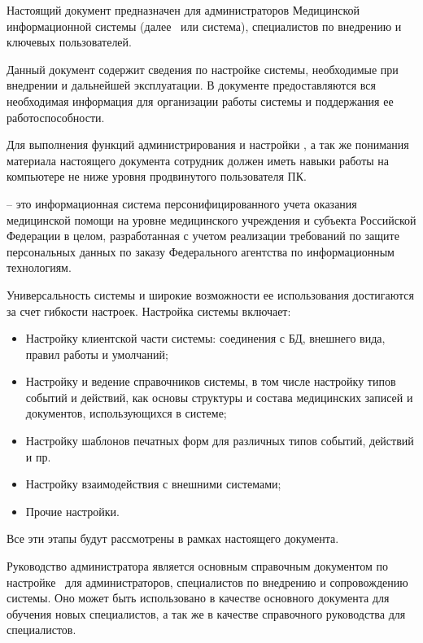 \newpage
{}

Настоящий документ предназначен для администраторов Медицинской информационной системы (далее \tmis~или система), специалистов по внедрению и ключевых пользователей. 

Данный документ содержит сведения по настройке системы, необходимые при внедрении и дальнейшей эксплуатации. В документе предоставляются вся необходимая информация для организации работы системы и поддержания ее работоспособности.

Для выполнения функций администрирования и настройки \tmis, а так же понимания материала настоящего документа сотрудник должен иметь навыки работы на компьютере не ниже уровня продвинутого пользователя ПК.

\textbf{\tmis} – это информационная система персонифицированного учета оказания медицинской помощи на уровне медицинского учреждения и субъекта Российской Федерации в целом, разработанная с учетом реализации требований по защите персональных данных по заказу Федерального агентства по информационным технологиям. \index{\tmis}

Универсальность системы и широкие возможности ее использования достигаются за счет гибкости настроек. Настройка системы включает:
\begin{itemize}
 \item Настройку клиентской части системы: соединения с БД, внешнего вида, правил работы и умолчаний;
 \item Настройку и ведение справочников системы, в том числе настройку типов событий и действий, как основы структуры и состава медицинских записей и документов, использующихся в системе;
 \item Настройку шаблонов печатных форм для различных типов событий, действий и пр.
 \item Настройку взаимодействия с внешними системами;
 \item Прочие настройки.
\end{itemize}
 
Все эти этапы будут рассмотрены в рамках настоящего документа.

\newpage
{}

Руководство администратора является основным справочным документом по настройке \tmis~для администраторов, специалистов по внедрению и сопровождению системы. Оно может быть использовано в качестве основного документа для обучения новых специалистов, а так же в качестве справочного руководства для специалистов.

